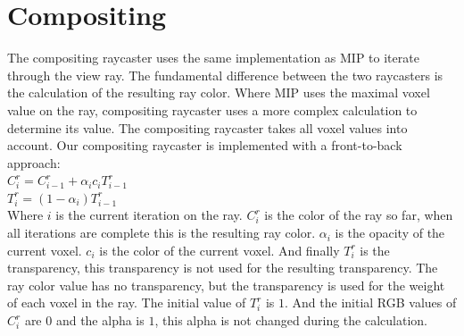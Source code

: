 
\section{Compositing}\label{sec:compositing}
The compositing raycaster uses the same implementation as MIP to iterate through the view ray.
The fundamental difference between the two raycasters is the calculation of the resulting ray color.
Where MIP uses the maximal voxel value on the ray, compositing raycaster uses a more complex calculation to determine its value.
The compositing raycaster takes all voxel values into account.
Our compositing raycaster is implemented with a front-to-back approach:\\
$C_{i}^{r} = C_{i-1}^{r} + \alpha_{i} c_{i} T_{i-1}^{r}$\\
$T_{i}^{r} = (1 - \alpha_{i}) T_{i-1}^{r}$\\
Where $i$ is the current iteration on the ray.
$C^{r}_{i}$ is the color of the ray so far, when all iterations are complete this is the resulting ray color.
$\alpha_{i}$ is the opacity of the current voxel.
$c_{i}$ is the color of the current voxel.
And finally $T^{r}_{i}$ is the transparency, this transparency is not used for the resulting transparency.
The ray color value has no transparency, but the transparency is used for the weight of each voxel in the ray.
The initial value of $T^{r}_{i}$ is $1$.
And the initial RGB values of $C_{i}^{r}$ are $0$ and the alpha is $1$, this alpha is not changed during the calculation.

